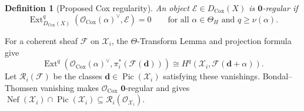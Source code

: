 \documentclass[11pt,reqno]{amsart}
\newtheorem{defn}[lemma]{Definition}
\theoremstyle{remark}
\newcommand{\Ext}{\operatorname{Ext}}
\newcommand{\Pic}{\operatorname{Pic}}
\newcommand{\Nef}{\operatorname{Nef}}
\newcommand{\Cox}{\operatorname{Cox}}
\newcommand{\dd}{\mathbf{d}}
\newcommand{\zero}{\mathbf{0}}
\newcommand{\PP}{\mathbb{P}}
\newcommand{\cE}{\mathcal{E}}
\newcommand{\cF}{\mathcal{F}}
\newcommand{\cH}{\mathcal{H}}
\newcommand{\cO}{\mathcal{O}}
\newcommand{\cR}{\mathcal{R}}
\newcommand{\cX}{\mathcal{X}}
\begin{document}


\begin{defn}[Proposed Cox regularity]\label{def:cox-regularity}
An object $\cE\in D_{\Cox}(X)$ is \emph{$\zero$-regular} if
\[
 \Ext^{q}_{D_{\Cox}(X)}
 \left(\cO_{\Cox}(\alpha)^\vee,\cE\right)=0
\qquad\text{for all }\alpha\in\Theta_H\text{ and }q\geq\nu(\alpha).
\]
\end{defn}
For a coherent sheaf $\cF$ on $\cX_i$, the $\Theta$-Transform Lemma \cite[Lem. 1.6]{longLiveKing} and projection formula give
\[
 \Ext^{q}
 \left(\cO_{\Cox}(\alpha)^\vee,
       \pi_i^*(\cF(\dd))\right)
 \cong H^q(\cX_i,\cF(\dd+\alpha)).
\]
Let $\cR_i(\cF)$ be the classes $\dd\in\Pic(\cX_i)$ satisfying these vanishings. Bondal--Thomsen vanishing makes $\cO_{\Cox}$ $\zero$-regular and gives $\Nef(\cX_i)\cap\Pic(\cX_i)\subseteq\cR_i(\cO_{\cX_i})$.
\end{document}
